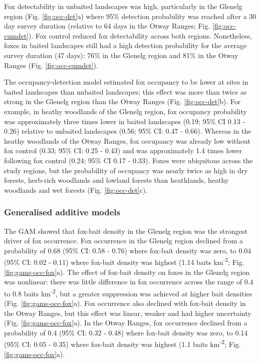 \documentclass[11pt,a4paper,titlepage,twoside,openright]{style/unimelbthesis}
\begin{document}
\begin{mainmatter}
Fox detectability in unbaited landscapes was high, particularly in the Glenelg region (Fig. \ref{fig:occ-det}a) where 95\% detection probability was reached after a 30 day survey duration (relative to 64 days in the Otway Ranges; Fig. \ref{fig:occ-cumdet}). Fox control reduced fox detectability across both regions. Nonetheless, foxes in baited landscapes still had a high detection probability for the average survey duration (47 days): 76\% in the Glenelg region and 81\% in the Otway Ranges (Fig. \ref{fig:occ-cumdet}).

The occupancy-detection model estimated fox occupancy to be lower at sites in baited landscapes than unbaited landscapes; this effect was more than twice as strong in the Glenelg region than the Otway Ranges (Fig. \ref{fig:occ-det}b). For example, in heathy woodlands of the Glenelg region, fox occupancy probability was approximately three times lower in baited landscapes (0.19; 95\% CI 0.13 - 0.26) relative to unbaited landscapes (0.56; 95\% CI: 0.47 - 0.66). Whereas in the heathy woodlands of the Otway Ranges, fox occupancy was already low without fox control (0.33; 95\% CI: 0.25 - 0.43) and was approximately 1.4 times lower following fox control (0.24; 95\% CI 0.17 - 0.33). Foxes were ubiquitous across the study regions, but the probability of occupancy was nearly twice as high in dry forests, herb-rich woodlands and lowland forests than heathlands, heathy woodlands and wet forests (Fig. \ref{fig:occ-det}c).

\hypertarget{generalised-additive-models-1}{%
\subsubsection{Generalised additive models}\label{generalised-additive-models-1}}

The GAM showed that fox-bait density in the Glenelg region was the strongest driver of fox occurrence. Fox occurrence in the Glenelg region declined from a probability of 0.68 (95\% CI: 0.58 - 0.76) where fox-bait density was zero, to 0.04 (95\% CI: 0.02 - 0.11) where fox-bait density was highest (1.14 baits km\textsuperscript{-2}; Fig. \ref{fig:gams-occ-fox}a). The effect of fox-bait density on foxes in the Glenelg region was nonlinear: there was little difference in fox occurrence across the range of 0.4 to 0.8 baits km\textsuperscript{-2}, but a greater suppression was achieved at higher bait densities (Fig. \ref{fig:gams-occ-fox}a). Fox occurrence also declined with fox-bait density in the Otway Ranges, but this effect was linear, weaker and had higher uncertainty (Fig. \ref{fig:gams-occ-fox}a). In the Otway Ranges, fox occurrence declined from a probability of 0.4 (95\% CI: 0.32 - 0.48) where fox-bait density was zero, to 0.14 (95\% CI: 0.05 - 0.35) where fox-bait density was highest (1.1 baits km\textsuperscript{-2}; Fig. \ref{fig:gams-occ-fox}a).


\end{mainmatter}
\end{document}
